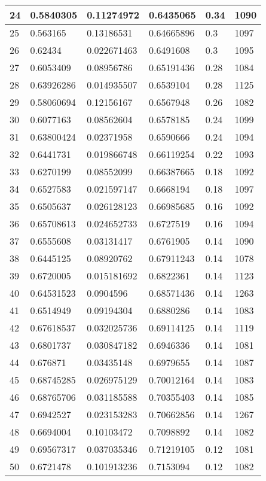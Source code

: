 \begin{longtable}{|l|l|l|l|l|l|}
24 & 0.5840305 & 0.11274972 & 0.6435065 & 0.34 & 1090 \\ \hline 
25 & 0.563165 & 0.13186531 & 0.64665896 & 0.3 & 1097 \\ \hline 
26 & 0.62434 & 0.022671463 & 0.6491608 & 0.3 & 1095 \\ \hline 
27 & 0.6053409 & 0.08956786 & 0.65191436 & 0.28 & 1084 \\ \hline 
28 & 0.63926286 & 0.014935507 & 0.6539104 & 0.28 & 1125 \\ \hline 
29 & 0.58060694 & 0.12156167 & 0.6567948 & 0.26 & 1082 \\ \hline 
30 & 0.6077163 & 0.08562604 & 0.6578185 & 0.24 & 1099 \\ \hline 
31 & 0.63800424 & 0.02371958 & 0.6590666 & 0.24 & 1094 \\ \hline 
32 & 0.6441731 & 0.019866748 & 0.66119254 & 0.22 & 1093 \\ \hline 
33 & 0.6270199 & 0.08552099 & 0.66387665 & 0.18 & 1092 \\ \hline 
34 & 0.6527583 & 0.021597147 & 0.6668194 & 0.18 & 1097 \\ \hline 
35 & 0.6505637 & 0.026128123 & 0.66985685 & 0.16 & 1092 \\ \hline 
36 & 0.65708613 & 0.024652733 & 0.6727519 & 0.16 & 1094 \\ \hline 
37 & 0.6555608 & 0.03131417 & 0.6761905 & 0.14 & 1090 \\ \hline 
38 & 0.6445125 & 0.08920762 & 0.67911243 & 0.14 & 1078 \\ \hline 
39 & 0.6720005 & 0.015181692 & 0.6822361 & 0.14 & 1123 \\ \hline 
40 & 0.64531523 & 0.0904596 & 0.68571436 & 0.14 & 1263 \\ \hline 
41 & 0.6514949 & 0.09194304 & 0.6880286 & 0.14 & 1083 \\ \hline 
42 & 0.67618537 & 0.032025736 & 0.69114125 & 0.14 & 1119 \\ \hline 
43 & 0.6801737 & 0.030847182 & 0.6946336 & 0.14 & 1081 \\ \hline 
44 & 0.676871 & 0.03435148 & 0.6979655 & 0.14 & 1087 \\ \hline 
45 & 0.68745285 & 0.026975129 & 0.70012164 & 0.14 & 1083 \\ \hline 
46 & 0.68765706 & 0.031185588 & 0.70355403 & 0.14 & 1085 \\ \hline 
47 & 0.6942527 & 0.023153283 & 0.70662856 & 0.14 & 1267 \\ \hline 
48 & 0.6694004 & 0.10103472 & 0.7098892 & 0.14 & 1082 \\ \hline 
49 & 0.69567317 & 0.037035346 & 0.71219105 & 0.12 & 1081 \\ \hline 
50 & 0.6721478 & 0.101913236 & 0.7153094 & 0.12 & 1082 \\ \hline 
\end{longtable}